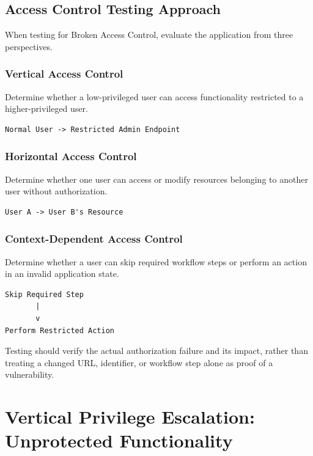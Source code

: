 \documentclass[11pt,a4paper]{article}
\begin{document}
\subsection{Access Control Testing Approach}

When testing for Broken Access Control, evaluate the application from three perspectives.

\subsubsection{Vertical Access Control}

Determine whether a low-privileged user can access functionality restricted to a higher-privileged user.

\begin{lstlisting}
Normal User -> Restricted Admin Endpoint
\end{lstlisting}

\subsubsection{Horizontal Access Control}

Determine whether one user can access or modify resources belonging to another user without authorization.

\begin{lstlisting}
User A -> User B's Resource
\end{lstlisting}

\subsubsection{Context-Dependent Access Control}

Determine whether a user can skip required workflow steps or perform an action in an invalid application state.

\begin{lstlisting}
Skip Required Step
       |
       v
Perform Restricted Action
\end{lstlisting}

Testing should verify the actual authorization failure and its impact, rather than treating a changed URL, identifier, or workflow step alone as proof of a vulnerability.

\newpage
\section{Vertical Privilege Escalation: Unprotected Functionality}
\end{document}
